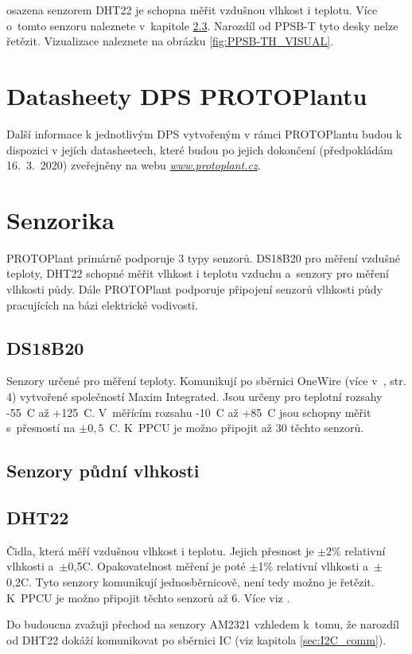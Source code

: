 \noindent{} osazena senzorem DHT22 \cite{DHT22} je schopna měřit vzdušnou vlhkost i teplotu.
Více o~tomto senzoru naleznete v~kapitole \ref{sec:DHT22}.
Narozdíl od PPSB-T tyto desky nelze řetězit.
Vizualizace naleznete na obrázku \ref{fig:PPSB-TH_VISUAL}.\newline

\section{Datasheety DPS PROTOPlantu}
\label{sec:DPS_datasheets}
Další informace k jednotlivým DPS vytvořeným v rámci PROTOPlantu budou k dispozici v jejích datasheetech, které budou po jejich dokončení (předpokládám 16.~3.~2020) zveřejněny na webu \textit{\url{www.protoplant.cz}}.

\section{Senzorika}
PROTOPlant primárně podporuje 3 typy senzorů. 
DS18B20 pro měření vzdušné teploty, DHT22 schopné měřit vlhkost i teplotu vzduchu a~senzory pro měření vlhkosti půdy.
Dále PROTOPlant podporuje připojení senzorů vlhkosti půdy pracujících na bázi elektrické vodivosti.

\subsection{DS18B20}
\label{sec:DS18B20}
Senzory určené pro měření teploty. 
Komunikují po sběrnici OneWire (více v~\cite{DS18B20}, str. 4) vytvořené společností Maxim Integrated.
Jsou určeny pro teplotní rozsahy -55~\degree C až +125~\degree C.
V~měřícím rozsahu -10~\degree C až +85~\degree C jsou schopny měřit s~přesností na $\pm0,5$~\degree C.
K~PPCU je možno připojit až 30 těchto senzorů.


\subsection{Senzory půdní vlhkosti}

\subsection{DHT22}
\label{sec:DHT22}
Čidla, která měří vzdušnou vlhkost i teplotu.
Jejich přesnost je $\pm2\%$ relativní vlhkosti a~$\pm$0,5\degree C.
Opakovatelnost měření je poté $\pm$1\% relativní vlhkosti a~$\pm$0,2\degree C.
Tyto senzory komunikují jednosběrnicově, není tedy možno je řetězit.
K~PPCU je možno připojit těchto senzorů až 6.
Více viz \cite{DHT22}.

Do budoucna zvažuji přechod na senzory AM2321 \cite{AM2321} vzhledem k~tomu, že narozdíl od DHT22 dokáží komunikovat po sběrnici IC (viz kapitola \ref{sec:I2C_comm}).

\newpage